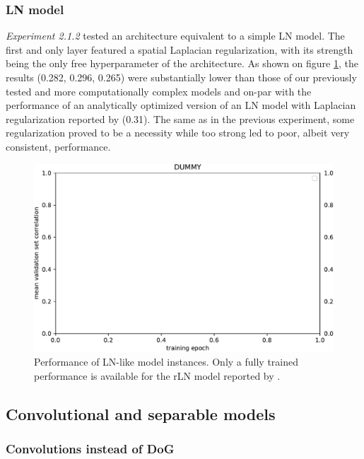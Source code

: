 \subsubsection{LN model}

\textit{Experiment 2.1.2} tested an architecture equivalent to a simple LN model. The first and only layer featured a spatial Laplacian regularization, with its strength being the only free hyperparameter of the architecture. As shown on figure \ref{fig:5.2.1.2}, the results (0.282, 0.296, 0.265) were substantially lower than those of our previously tested and more computationally complex models and on-par with the performance of an analytically optimized version of an LN model with Laplacian regularization reported by \cite{antolik} (0.31). The same as in the previous experiment, some regularization proved to be a necessity while too strong led to poor, albeit very consistent, performance.

\begin{figure}[H]
    \centering
    \includegraphics[width=1\textwidth]{../figures/05_dummy}
    \caption[Experiment 2.1.2]{Performance of LN-like model instances. Only a fully trained performance is available for the rLN model reported by \citeauthor{antolik}\protect\footnotemark.}
    \label{fig:5.2.1.2}
\end{figure}

\subsection{Convolutional and separable models}
\subsubsection{Convolutions instead of DoG}

